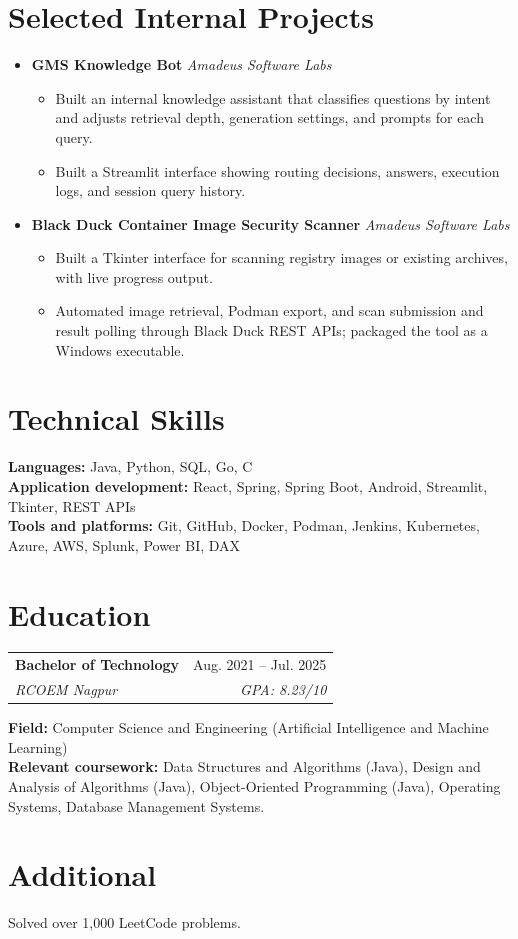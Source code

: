 \documentclass[a4paper,11pt]{article}
\newcommand{\bulletpoint}[1]{\item\small{#1}}
\begin{document}
\section{Selected Internal Projects}
\begin{itemize}[leftmargin=0in,label={}]
  \item \textbf{GMS Knowledge Bot} \hfill \textit{\small Amadeus Software Labs}
  \begin{itemize}
    \bulletpoint{Built an internal knowledge assistant that classif{}ies questions by intent and adjusts retrieval depth, generation settings, and prompts for each query.}
    \bulletpoint{Built a Streamlit interface showing routing decisions, answers, execution logs, and session query history.}
  \end{itemize}
  \item \textbf{Black Duck Container Image Security Scanner} \hfill \textit{\small Amadeus Software Labs}
  \begin{itemize}
    \bulletpoint{Built a Tkinter interface for scanning registry images or existing archives, with live progress output.}
    \bulletpoint{Automated image retrieval, Podman export, and scan submission and result polling through Black Duck REST APIs; packaged the tool as a Windows executable.}
  \end{itemize}
\end{itemize}

\section{Technical Skills}
\small\textbf{Languages:} Java, Python, SQL, Go, C \\
\textbf{Application development:} React, Spring, Spring Boot, Android, Streamlit, Tkinter, REST APIs \\
\textbf{Tools and platforms:} Git, GitHub, Docker, Podman, Jenkins, Kubernetes, Azure, AWS, Splunk, Power BI, DAX

\section{Education}
\begin{tabularx}{\textwidth}{@{}Xr@{}}
  \textbf{Bachelor of Technology} & Aug. 2021 -- Jul. 2025 \\
  \textit{\small RCOEM Nagpur} & \textit{\small GPA: 8.23/10} \\
\end{tabularx}
\small\textbf{Field:} Computer Science and Engineering (Artif{}icial Intelligence and Machine Learning)\\
\small\textbf{Relevant coursework:} Data Structures and Algorithms (Java), Design and Analysis of Algorithms (Java), Object-Oriented Programming (Java), Operating Systems, Database Management Systems.

\section{Additional}
\small Solved over 1,000 LeetCode problems.
\end{document}
